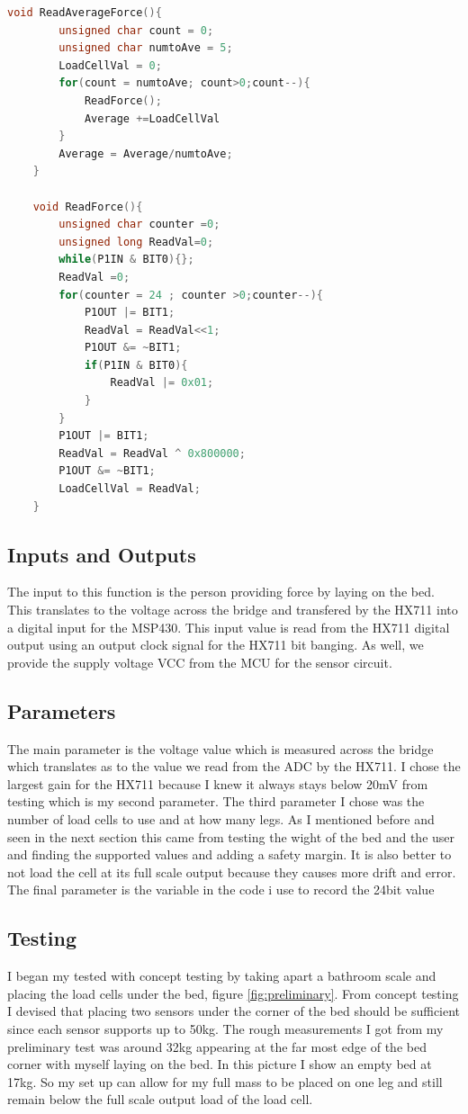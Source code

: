 \documentclass[11pt]{article}
\begin{document}
\begin{lstlisting}[label=ADCCode,caption=AX711 Reader Functions For Single ACD Value and Average, language = C,frame=single]
	void ReadAverageForce(){
		unsigned char count = 0;
		unsigned char numtoAve = 5;
		LoadCellVal = 0;
		for(count = numtoAve; count>0;count--){
			ReadForce();
			Average +=LoadCellVal
		}
		Average = Average/numtoAve;
	}
	
	void ReadForce(){
		unsigned char counter =0;
		unsigned long ReadVal=0;
		while(P1IN & BIT0){};
		ReadVal =0;
		for(counter = 24 ; counter >0;counter--){
			P1OUT |= BIT1;
			ReadVal = ReadVal<<1;
			P1OUT &= ~BIT1;
			if(P1IN & BIT0){
				ReadVal |= 0x01;
			}
		}
		P1OUT |= BIT1;
		ReadVal = ReadVal ^ 0x800000;
		P1OUT &= ~BIT1;
		LoadCellVal = ReadVal;
	}
\end{lstlisting}

\subsection*{Inputs and Outputs}
The input to this function is the person providing force by laying on the bed.
This translates to the voltage across the bridge and transfered by the HX711 into a digital input for the MSP430.
This input value is read from the HX711 digital output using an output clock signal for the HX711 bit banging. 
As well, we provide the supply voltage VCC from the MCU for the sensor circuit.

\subsection*{Parameters}
The main parameter is the voltage value which is measured across the bridge which translates as to the value we read from the ADC by the HX711.
I chose the largest gain for the HX711 because I knew it always stays below 20mV from testing which is my second parameter. 
The third parameter I chose was the number of load cells to use and at how many legs. 
As I mentioned before and seen in the next section this came from testing the wight of the bed and the user and finding the supported values and adding a safety margin. 
It is also better to not load the cell at its full scale output because they causes more drift and error. 
The final parameter is the variable in the code i use to record the 24bit value

\subsection*{Testing}
I began my tested with concept testing by taking apart a bathroom scale and placing the load cells under the bed, figure \ref{fig:preliminary}.
From concept testing I devised that placing two sensors under the corner of the bed should be sufficient since each sensor supports up to 50kg. 
The rough measurements I got from my preliminary test was around 32kg appearing at the far most edge of the bed corner with myself laying on the bed.
In this picture I show an empty bed at 17kg.
So my set up can allow for my full mass to be placed on one leg and still remain below the full scale output load of the load cell. \\
\end{document}
